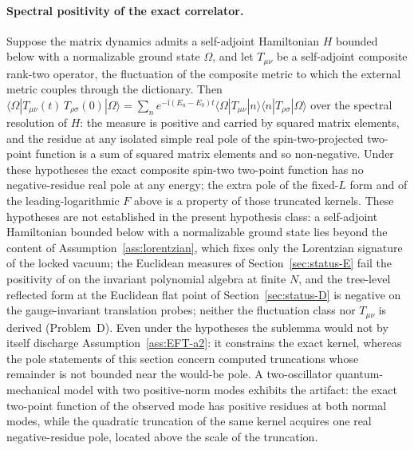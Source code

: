 \paragraph{Spectral positivity of the exact correlator.}
Suppose the matrix dynamics admits a self-adjoint Hamiltonian \(H\)
bounded below with a normalizable ground state \(\Omega\), and let
\(T_{\mu\nu}\) be a self-adjoint composite rank-two operator, the
fluctuation of the composite metric to which the external metric
couples through the dictionary. Then
\(\langle\Omega|T_{\mu\nu}(t)\,T_{\rho\sigma}(0)|\Omega\rangle
=\sum_n e^{-\mathrm i(E_n-E_0)t}
\langle\Omega|T_{\mu\nu}|n\rangle\langle n|T_{\rho\sigma}|\Omega
\rangle\) over the spectral resolution of \(H\): the measure is
positive and carried by squared matrix elements, and the residue at
any isolated simple real pole of the spin-two-projected two-point
function is a sum of squared matrix elements and so non-negative.
Under these hypotheses the exact composite spin-two two-point
function has no negative-residue real pole at any energy; the extra
pole of the fixed-\(L\) form and of the leading-logarithmic \(F\)
above is a property of those truncated kernels. These hypotheses
are not established in the present hypothesis class: a
self-adjoint Hamiltonian bounded below with a normalizable ground
state lies beyond the content of Assumption~\ref{ass:lorentzian},
which fixes only the Lorentzian signature of the locked vacuum; the
Euclidean measures of Section~\ref{sec:status-E} fail the positivity
of \cite{OsterwalderSchrader1973,OsterwalderSchrader1975} on the
invariant polynomial algebra at finite \(N\), and the tree-level
reflected form at the Euclidean flat point of
Section~\ref{sec:status-D} is negative on the gauge-invariant
translation probes; neither the fluctuation class nor \(T_{\mu\nu}\)
is derived (Problem~D). Even under the hypotheses the sublemma
would not by itself discharge Assumption~\ref{ass:EFT-a2}: it
constrains the exact kernel, whereas the pole statements of this
section concern computed truncations whose remainder is not bounded
near the would-be pole. A two-oscillator quantum-mechanical model
with two positive-norm modes exhibits the artifact: the exact
two-point function of the observed mode has positive residues at
both normal modes, while the quadratic truncation of the same
kernel acquires one real negative-residue pole, located above the
scale of the truncation.

